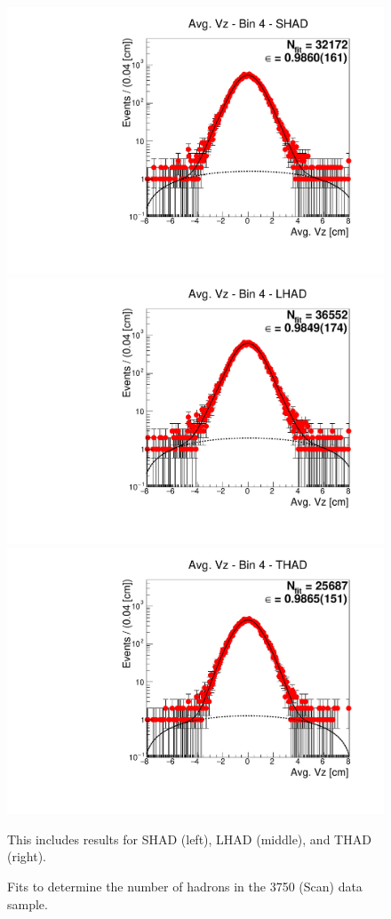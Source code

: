 \begin{figure}[H]
\centering
\includegraphics[scale=0.25]{figures/plots/nonDDbar_fit_results/scan/fit_scan_04_data_SHAD.pdf}
\hspace{-0.5cm}
\includegraphics[scale=0.25]{figures/plots/nonDDbar_fit_results/scan/fit_scan_04_data_LHAD.pdf}
\hspace{-0.5cm}
\includegraphics[scale=0.25]{figures/plots/nonDDbar_fit_results/scan/fit_scan_04_data_THAD.pdf}
\caption{Fits to determine the number of hadrons in the 3750 (Scan) data sample.}
{This includes results for SHAD (left), LHAD (middle), and THAD (right).}
\label{fig:hadron_fits_scan_04}
\end{figure}

